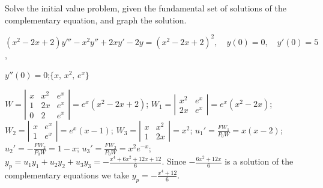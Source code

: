 \documentclass{ximera}
\begin{document}
\begin{problem}\label{exer:9.4.26} Solve the
initial value problem, given the fundamental set of solutions of the complementary equation, and graph the solution.

$(x^2-2x+2)y'''-x^2y''+2xy'-2y=(x^2-2x+2)^2, \quad  y(0)=0,\quad y'(0)=5$,

$y''(0)=0$;\quad       $\{x,\,x^2,\,e^x\}$

\begin{solution}
$W=\left|\begin{array}{cccc}
x&x^2&e^x\\1&2x&e^x\\0&2&e^x\end{array}\right|=e^x(x^2-2x+2)$;
$W_1=\left|\begin{array}{cccc}
x^2&e^x\\2x&e^x\end{array}\right|=e^x(x^2-2x)$;
$W_2=\left|\begin{array}{cccc}x&e^x\\1&e^x\end{array}\right|=e^x(x-1)$;
$W_3=\left|\begin{array}{cccc}x&x^2\\1&2x\end{array}\right|=x^2$;
$u_1'=\frac{FW_1}{P_0W}=x(x-2)$;
$u_2'=-\frac{FW_2}{P_0W}=1-x$;
$u_3'=\frac{FW_2}{P_0W}=x^2e^{-x}$;
$y_p=u_1y_1+u_2y_2+u_3y_3=-\frac{x^4+6x^2+12x+12}{6}$. Since
$-\frac{6x^2+12x}{6}$ is a solution of the complementary equations
we take $y_p=-\frac{x^4+12}{6}$.


\end{solution}
\end{problem}
\end{document}
